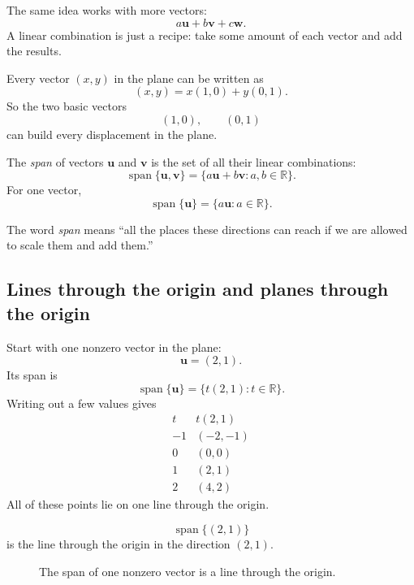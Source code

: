 The same idea works with more vectors:
\[
    a\mathbf u+b\mathbf v+c\mathbf w.
\]
A linear combination is just a recipe: take some amount of each vector and add the
results.

\begin{example}
Every vector \((x,y)\) in the plane can be written as
\[
    (x,y)=x(1,0)+y(0,1).
\]
So the two basic vectors
\[
    (1,0), \qquad (0,1)
\]
can build every displacement in the plane.
\end{example}

\begin{definition}[Span]
The \emph{span} of vectors \(\mathbf u\) and \(\mathbf v\) is the set of all their
linear combinations:
\[
    \operatorname{span}\{\mathbf u,\mathbf v\}
    =
    \{a\mathbf u+b\mathbf v : a,b\in\mathbb R\}.
\]
For one vector,
\[
    \operatorname{span}\{\mathbf u\}
    =
    \{a\mathbf u : a\in\mathbb R\}.
\]
\end{definition}

The word \emph{span} means ``all the places these directions can reach if we are
allowed to scale them and add them.''

\subsection{Lines through the origin and planes through the origin}

Start with one nonzero vector in the plane:
\[
    \mathbf u=(2,1).
\]
Its span is
\[
    \operatorname{span}\{\mathbf u\}
    =
    \{t(2,1):t\in\mathbb R\}.
\]
Writing out a few values gives
\[
\begin{array}{c|c}
t & t(2,1) \\ \hline
-1 & (-2,-1)\\
0 & (0,0)\\
1 & (2,1)\\
2 & (4,2)
\end{array}
\]
All of these points lie on one line through the origin.

\[
    \operatorname{span}\{(2,1)\}
\]
is the line through the origin in the direction \((2,1)\).

\begin{figure}[h]
\centering
{}
\caption{The span of one nonzero vector is a line through the origin.}
\end{figure}

